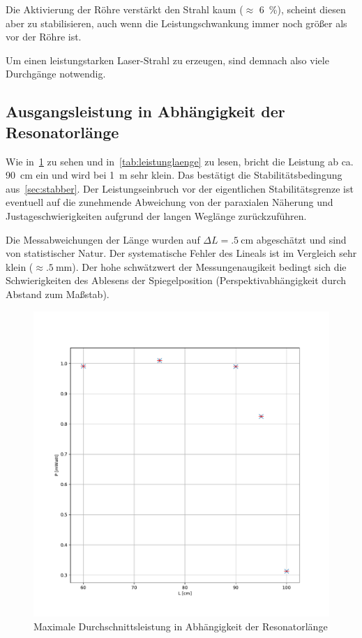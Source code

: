 \documentclass[slug=GL, room=HZDR\ Dresden/Rossendorf\,\ Geb.\ 620/123, supervisor=Martin\ Rehwald;\, Tim\ Ziegler]{../../Lab_Report_LaTeX/lab_report}
\begin{document}
Die Aktivierung der R\"ohre verst\"arkt den Strahl kaum (\(\approx\)
\SI{6}{\percent}), scheint diesen aber zu stabilisieren, auch wenn die
Leistungschwankung immer noch gr\"o\ss{}er als vor der R\"ohre ist.

Um einen leistungstarken Laser-Strahl zu erzeugen, sind demnach also
viele Durchg\"ange notwendig.

\subsection{Ausgangsleistung in Abh\"angigkeit der Resonatorl\"ange}

Wie in~\ref{fig:power-over-l} zu sehen und in~\ref{tab:leistunglaenge}
zu lesen, bricht die Leistung ab
ca. \SI{90}{\centi\meter} ein und wird bei \SI{1}{\meter} sehr klein.
Das best\"atigt die Stabilit\"atsbedingung aus~\ref{sec:stabber}. Der
Leistungseinbruch vor der eigentlichen Stabilit\"atsgrenze ist
eventuell auf die zunehmende Abweichung von der paraxialen N\"aherung
und Justageschwierigkeiten aufgrund der langen Wegl\"ange
zur\"uckzuf\"uhren.

Die Messabweichungen der L\"ange wurden auf \(\Delta L = \SI{.5}{\centi\meter}\)
abgesch\"atzt und sind von statistischer Natur. Der systematische
Fehler des Lineals ist im Vergleich sehr klein (\(\approx
\SI{.5}{\milli\meter}\)). Der hohe schw\"atzwert der Messungenaugikeit
bedingt sich die Schwierigkeiten des Ablesens der Spiegelposition
(Perspektivabh\"angigkeit durch Abstand zum Ma\ss{}stab).
\begin{figure}[H]\centering
  \includegraphics[width=.8\columnwidth]{figs/power-over-l.pdf}
  \caption{Maximale Durchschnittsleistung in Abh\"angigkeit der Resonatorl\"ange }
  \label{fig:power-over-l}
\end{figure}
\end{document}
